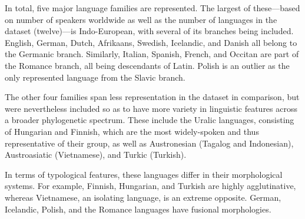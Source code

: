 \documentclass[12pt,a4paper]{article}
\numberwithin{figure}{section}
\numberwithin{table}{section}
\numberwithin{definition}{section}
\begin{document}
In total, five major language families are represented. The largest of these---based on number of speakers worldwide as well as the number of languages in the dataset (twelve)---is Indo-European, with several of its branches being included. English, German, Dutch, Afrikaans, Swedish, Icelandic, and Danish all belong to the Germanic branch. Similarly, Italian, Spanish, French, and Occitan are part of the Romance branch, all being descendants of Latin. Polish is an outlier as the only represented language from the Slavic branch. 

The other four families span less representation in the dataset in comparison, but were nevertheless included so as to have more variety in linguistic features across a broader phylogenetic spectrum. These include the Uralic languages, consisting of Hungarian and Finnish, which are the most widely-spoken and thus representative of their group, as well as Austronesian (Tagalog and Indonesian), Austroasiatic (Vietnamese), and Turkic (Turkish). 


In terms of typological features, these languages differ in their morphological systems. For example, Finnish, Hungarian, and Turkish are highly agglutinative, whereas Vietnamese, an isolating language, is an extreme opposite. German, Icelandic, Polish, and the Romance languages have fusional morphologies.

\end{document}
